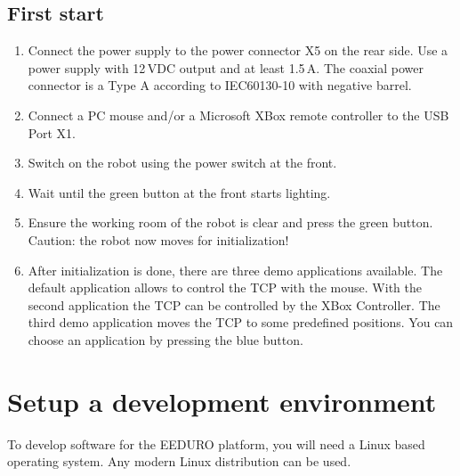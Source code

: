 \subsection{First start}
\begin{enumerate}
	\item Connect the power supply to the power connector X5 on the rear side. Use a power supply with 12\,VDC output and at least 1.5\,A. The coaxial power connector is a Type A according to IEC60130-10 with negative barrel.
	\item Connect a PC mouse and/or a Microsoft XBox remote controller to the USB Port X1.
	\item Switch on the robot using the power switch at the front.
	\item Wait until the green button at the front starts lighting.
	\item Ensure the working room of the robot is clear and press the green button. Caution: the robot now moves for initialization!
	\item After initialization is done, there are three demo applications available. The default application allows to control the TCP with the mouse. With the second application the TCP can be controlled by the XBox Controller. The third demo application moves the TCP to some predefined positions. You can choose an application by pressing the blue button.
\end{enumerate}

\section{Setup a development environment}
To develop software for the EEDURO platform, you will need a Linux based operating system. Any modern Linux distribution can be used.

